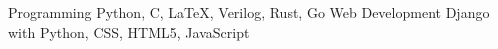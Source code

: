 


\begin{cvskills}
\cvskill
{Programming} %
{Python, C, LaTeX, Verilog, Rust, Go} %
\cvskill
{Web Development} %
{Django with Python, CSS, HTML5, JavaScript} %
\end{cvskills}